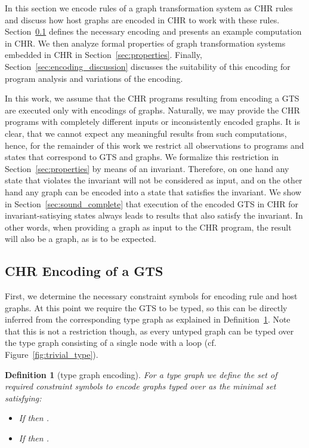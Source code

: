 \documentclass{tlp}
\newtheorem{definition}{Definition}[section]
\begin{document}
In this section we encode rules of a graph transformation system as CHR rules and
discuss how host graphs are encoded in CHR to work with these rules.
Section~\ref{sec:default_encoding}  defines the necessary encoding and presents
an example computation in CHR. We then analyze formal properties of graph
transformation systems embedded in CHR in Section~\ref{sec:properties}. Finally,
Section~\ref{sec:encoding_discussion} discusses the suitability of this encoding
for program analysis and variations of the encoding.

In this work, we assume that the CHR programs resulting from encoding a GTS are
executed only with encodings of graphs. Naturally, we may provide the CHR
programs with completely different inputs or inconsistently encoded graphs. It is
clear, that we cannot expect any meaningful results from such computations,
hence, for the remainder of this work we restrict all observations to programs
and states that correspond to GTS and graphs. We formalize this restriction in
Section~\ref{sec:properties} by means of an invariant. Therefore, on one hand any
state that violates the invariant will not be considered as input, and on the
other hand any graph can be encoded into a state that satisfies the invariant. We
show in Section~\ref{sec:sound_complete} that execution of the encoded GTS in CHR
for invariant-satisying states always leads to results that also satisfy the
invariant. In other words, when providing a graph as input to the CHR program,
the result will also be a graph, as is to be expected.

\subsection{CHR Encoding of a GTS}
\label{sec:default_encoding}

First, we determine the necessary constraint symbols for encoding rule and host
graphs. At this point we require the GTS to be typed, so this can be directly
inferred from the corresponding type graph as explained in
Definition~\ref{def:constraints_i}. Note that this is not a restriction though,
as every untyped graph can be typed over the type graph consisting of a single
node with a loop (cf. Figure~\ref{fig:trivial_type}).

\begin{definition}[type graph encoding] \label{def:constraints_i}
For a type graph  we define the set  of required constraint
symbols to encode graphs typed over  as the minimal set satisfying:
\begin{itemize}
  \item If  then .
  \item If  then .
\end{itemize}
\end{definition}
\end{document}
